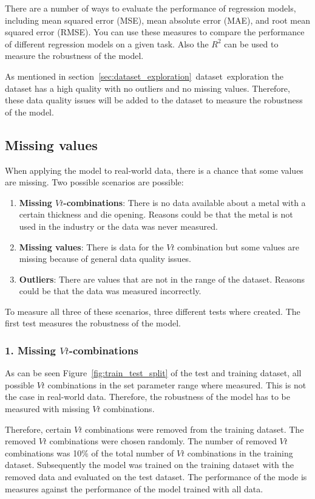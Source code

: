 There are a number of ways to evaluate the performance of regression models, including mean
squared error (MSE), mean absolute error (MAE), and root mean squared error (RMSE). You can use
these measures to compare the performance of different regression models on a given task. Also
the $R^2$ can be used to measure the robustness of the model.

As mentioned in section~\ref{sec:dataset_exploration}~dataset~exploration the dataset has a high
quality with no outliers and no missing values.
Therefore, these data quality issues will be added to the dataset to measure the robustness of
the model.

\subsection{Missing values}
When applying the model to real-world data, there is a chance that some values are missing. Two
possible scenarios are possible:

\begin{enumerate}
    \item \textbf{Missing $Vt$-combinations}: There is no data available about a metal with a
    certain thickness and die opening. Reasons could be that the metal is not used in the
    industry or the data was never measured.
    \item \textbf{Missing values}: There is data for the $Vt$ combination but some values are
    missing because of general data quality issues.
    \item \textbf{Outliers}: There are values that are not in the range of the dataset. Reasons
    could be that the data was measured incorrectly.
\end{enumerate}

To measure all three of these scenarios, three different tests where created. The first test
measures the robustness of the model.

\subsubsection*{1. Missing $Vt$-combinations}
As can be seen Figure~\ref{fig:train_test_split} of the test and training dataset, all possible
$Vt$ combinations in the set parameter range where measured.
This is not the case in real-world data. Therefore, the robustness of the model has to be
measured with missing $Vt$ combinations.

Therefore, certain $Vt$ combinations were removed from the training dataset. The removed $Vt$
combinations were chosen randomly. The number of removed $Vt$ combinations was 10\% of the total
number of $Vt$ combinations in the training dataset.
Subsequently the model was trained on the training dataset with the removed data and evaluated on
the test dataset.
The performance of the mode is measures against the performance of the model trained with all data.

